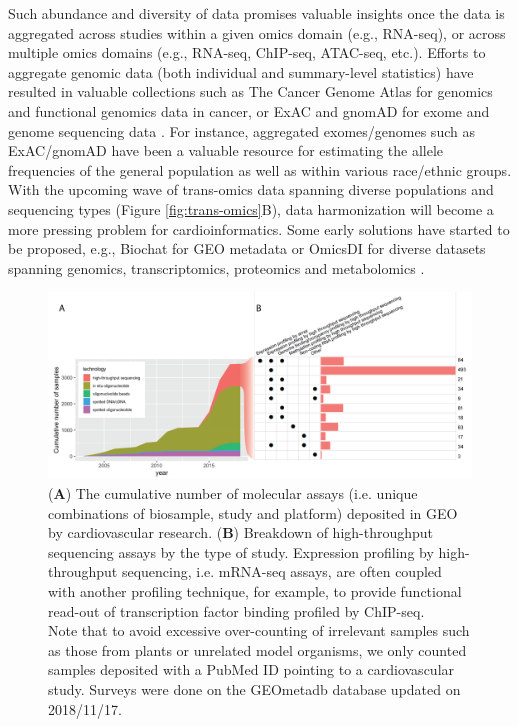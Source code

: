 \documentclass[letter]{bioinfo}
\begin{document}
	Such abundance and diversity of data promises valuable insights once the data is aggregated across studies within a given omics domain (e.g., RNA-seq), or across multiple omics domains (e.g., RNA-seq, ChIP-seq, ATAC-seq, etc.). Efforts to aggregate genomic data (both individual and summary-level statistics) have resulted in valuable collections such as The Cancer Genome Atlas \citep{TCGA:2013:Cancer} for genomics and functional genomics data in cancer, or ExAC and gnomAD for exome and genome sequencing data \citep{Lek:2016:Analysis}. For instance, aggregated exomes/genomes such as ExAC/gnomAD have been a valuable resource for estimating the allele frequencies of the general population as well as within various race/ethnic groups. With the upcoming wave of trans-omics data spanning diverse populations and sequencing types (Figure \ref{fig:trans-omics}B), data harmonization will become a more pressing problem for cardioinformatics. Some early solutions have started to be proposed, e.g., Biochat for GEO metadata \citep{Khomtchouk:2018:Biochat} or OmicsDI for diverse datasets spanning genomics, transcriptomics, proteomics and metabolomics \citep{Perez-Riverol:2017:Discovering}.
	
	\begin{figure}[!tpb]
		\includegraphics[width=1\linewidth]{assay-count-cardio}
		\caption{(\textbf{A}) The cumulative number of molecular assays (i.e. unique combinations of biosample, study and platform) deposited in GEO by cardiovascular research. (\textbf{B}) Breakdown of high-throughput sequencing assays by the type of study. Expression profiling by high-throughput sequencing, i.e. mRNA-seq assays, are often coupled with another profiling technique, for example, to provide functional read-out of transcription factor binding profiled by ChIP-seq. \label{fig:geo-assay}\\ Note that to avoid excessive over-counting of irrelevant samples such as those from plants or unrelated model organisms, we only counted samples deposited with a PubMed ID pointing to a cardiovascular study. Surveys were done on the GEOmetadb database \citep{Zhu:2008:GEOmetadb} updated on 2018/11/17.}
	\end{figure} 
	
\end{document}
